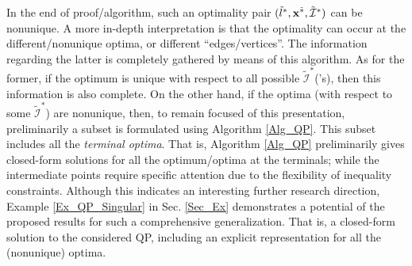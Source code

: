 \documentclass{imaman}
\newcommand{\bfx}{{\bf x}}
\newcommand{\calI}{{\mathcal I}}
\numberwithin{equation}{section}
\begin{document}
\begin{remark}
In the end of proof/algorithm, such an optimality pair $(\tilde l^*,\bfx^{\tilde *},\tilde\calI^*)$ can be nonunique. A more in-depth interpretation is that the optimality can occur at the different/nonunique optima, or different ``edges/vertices''. The information regarding the latter is completely gathered by means of this algorithm. As for the former, if the optimum is unique with respect to all possible $\tilde\calI^*$('s), then this information is also complete. On the other hand, if the optima (with respect to some $\tilde\calI^*$) are nonunique, then, to remain focused of this presentation, preliminarily a subset is formulated using Algorithm \ref{Alg_QP}. This subset includes all the \textit{terminal optima}. That is, Algorithm \ref{Alg_QP} preliminarily gives closed-form solutions for all the optimum/optima at the terminals; while the intermediate points require specific attention due to the flexibility of inequality constraints. Although this indicates an interesting further research direction, Example \ref{Ex_QP_Singular} in Sec. \ref{Sec_Ex} demonstrates a potential of the proposed results for such a comprehensive generalization. That is, a closed-form solution to the considered QP, including an explicit representation for all the (nonunique) optima.
\label{Rem_Terminal_Optima}
\end{remark}
\end{document}
